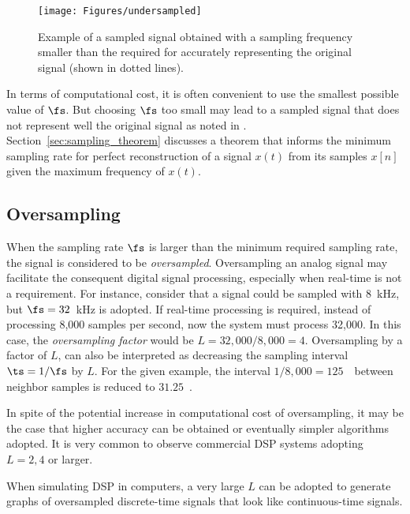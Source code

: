 \begin{figure}
	\centering
		\texttt{[image: Figures/undersampled]}	
	\caption{Example of a sampled signal obtained with a sampling frequency smaller than the required for accurately representing the original signal (shown in dotted lines).	\label{fig:undersampled}}
\end{figure}


In terms of computational cost, it is often convenient to use the smallest possible value of $\fs$. But choosing $\fs$ too small may lead to a sampled signal that does not represent well the original signal as noted in . Section~\ref{sec:sampling_theorem} discusses a theorem that informs the minimum sampling rate for perfect reconstruction of a signal $x(t)$ from its samples $x[n]$ given the maximum frequency of $x(t)$.


\subsection{Oversampling}
\label{sec:oversampling}

When the sampling rate $\fs$ is larger than the minimum required sampling rate, the signal is considered to be \emph{oversampled}. Oversampling an analog signal may facilitate the consequent digital signal processing, especially
when real-time is not a requirement. For instance, consider that a signal could be sampled with 8~kHz, but $\fs = 32$~kHz is adopted. If real-time processing is required, instead of processing 8,000 samples per second, now the system must process
32,000. In this case, the \emph{oversampling factor} would be $L=32,000/8,000=4$.
Oversampling by a factor of $L$, can also be interpreted as decreasing the sampling interval $\ts=1/\fs$ by $L$. For the
given example, the interval $1/8,000 = 125$~\mus~between neighbor samples is reduced to $31.25$~\mus.

In spite of the potential increase in computational cost of oversampling, it may be the case that higher accuracy can be obtained
or eventually simpler algorithms adopted. It is very common to observe commercial DSP systems adopting $L=2, 4$ or larger.

When simulating DSP in computers, a very large $L$ can be adopted to generate graphs of oversampled discrete-time signals that
look like continuous-time signals.

